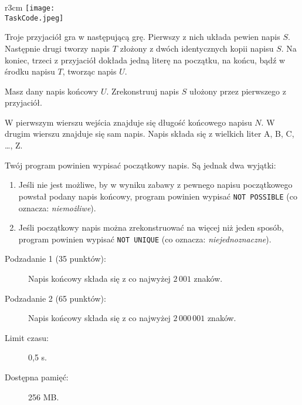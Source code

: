 \documentclass{boi2014-pl}
\renewcommand{\TaskCode}{friends}
\begin{document}
    \begin{wrapfigure}{r}{3cm}
		\texttt{[image: \\TaskCode.jpeg]}
	\end{wrapfigure}
    Troje przyjaciół gra w następującą grę.
    Pierwszy z nich układa pewien napis $S$.
    Następnie drugi tworzy napis $T$ złożony z dwóch identycznych kopii napisu $S$.
    Na koniec, trzeci z przyjaciół dokłada jedną literę na początku, na końcu, bądź w środku napisu $T$, tworząc napis $U$.

    \Task
    Masz dany napis końcowy $U$. Zrekonstruuj napis $S$ ułożony przez pierwszego z przyjaciół.

    \Input
    W pierwszym wierszu wejścia znajduje się długość końcowego napisu $N$.
    W drugim wierszu znajduje się sam napis.
    Napis składa się z wielkich liter A, B, C, \ldots{}, Z.

    \Output
    Twój program powinien wypisać początkowy napis.
    Są jednak dwa wyjątki:
    \begin{enumerate}
        \item Jeśli nie jest możliwe, by w wyniku zabawy z pewnego napisu początkowego powstał podany napis końcowy, program powinien wypisać {\tt NOT POSSIBLE}
          (co oznacza: \emph{niemożliwe}).
        \item Jeśli początkowy napis można zrekonstruować na więcej niż jeden sposób, program powinien wypisać {\tt NOT
          UNIQUE} (co oznacza: \emph{niejednoznaczne}).
    \end{enumerate}
    

    \Examples


    \Scoring

    \begin{description}
        \item[Podzadanie 1 (35 punktów):] Napis końcowy składa się z co najwyżej $2\,001$ znaków.
        \item[Podzadanie 2 (65 punktów):] Napis końcowy składa się z co najwyżej $2\,000\,001$ znaków.
    \end{description}

    \Constraints

    \begin{description}
        \item[Limit czasu:] 0,5 s.
        \item[Dostępna pamięć:] 256 MB.
    \end{description}
\end{document}
